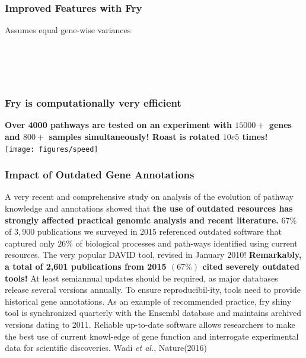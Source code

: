 \documentclass[9pt,t]{beamer}
\begin{document}
\begin{frame}
\frametitle{Improved Features with Fry}
Assumes equal gene-wise variances\\
\vfill
  \\
\vfill
  \\
\vfill
{}\\
\vfill
{}\\
\vfill
{}
\end{frame}

\begin{frame}
\frametitle{Fry is computationally very efficient}
\vfill
\large\textbf{\color{oxygenpurple}Over 4000 pathways are tested on an experiment with $15000+$ genes and $800+$ samples simultaneously! Roast is rotated $10e5$ times!}\\
\vfill
\texttt{[image: figures/speed]}
\end{frame}

\begin{frame}
\frametitle{Impact of Outdated Gene Annotations}
\vspace{0.2cm}
A very recent and comprehensive study on analysis of the evolution of pathway knowledge and annotations showed that \textbf{\color{oxygenpurple}the use of outdated resources has strongly affected practical genomic analysis and recent literature.} 
\vfill
$67\%$ of $3,900$ publications we surveyed in 2015 referenced outdated software that captured only $26\%$ of biological processes and path-ways identified using current resources.
\vfill
The very popular DAVID tool, revised in January 2010! 
\vfill
\textbf{\color{oxygenrose}Remarkably, a total of 2,601 publications from 2015 $(67\%)$ cited severely outdated tools!}
\vfill
At least semiannual updates should be required, as major databases release several versions annually. To ensure reproducibil-ity, tools need to provide historical gene annotations. As an example of recommended practice, fry shiny tool is synchronized quarterly with the Ensembl database and maintains archived versions dating to 2011. Reliable up-to-date software allows researchers to make the best use of current knowl-edge of gene function and interrogate experimental data for scientific  discoveries.
\vfill 
\hfill
\footnotesize Wadi \emph{et al.}, Nature(2016)
\end{frame}
\end{document}
